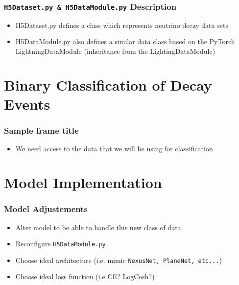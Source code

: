 \documentclass{beamer}
\begin{document}


\begin{frame}
	\frametitle{\texttt{H5Dataset.py \& H5DataModule.py} Description}
	
	\begin{itemize}
		\item H5Dataset.py defines a class which represents neutrino decay data sets
		\item H5DataModule.py also defines a similar data class based on the PyTorch LightningDataModule (inheritance from the LightingDataModule)
	\end{itemize}
\end{frame}


\section{Binary Classification of Decay Events}

\begin{frame}
\frametitle{Sample frame title}
	\begin{itemize}
		\item We need access to the data that we will be using for classification
	\end{itemize}
\end{frame}



\section{Model Implementation}

\begin{frame}
\frametitle{Model Adjustements}
	\begin{itemize}
		\item Alter model to be able to handle this new class of data

		\item Reconfigure \texttt{H5DataModule.py}
		\item Choose ideal architecture (i.e. mimic \texttt{NexusNet, PlaneNet, etc...})
		\item Choose ideal loss function (i.e CE? LogCosh?)
	\end{itemize}
\end{frame}
\end{document}
